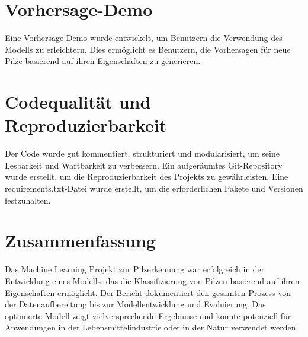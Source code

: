 \documentclass{article}
\begin{document}
\section{Vorhersage-Demo}
Eine Vorhersage-Demo wurde entwickelt, um Benutzern die Verwendung des Modells zu erleichtern. Dies ermöglicht es Benutzern, die Vorhersagen für neue Pilze basierend auf ihren Eigenschaften zu generieren.

\section{Codequalität und Reproduzierbarkeit}
Der Code wurde gut kommentiert, strukturiert und modularisiert, um seine Lesbarkeit und Wartbarkeit zu verbessern. Ein aufgeräumtes Git-Repository wurde erstellt, um die Reproduzierbarkeit des Projekts zu gewährleisten. Eine requirements.txt-Datei wurde erstellt, um die erforderlichen Pakete und Versionen festzuhalten.

\section{Zusammenfassung}
Das Machine Learning Projekt zur Pilzerkennung war erfolgreich in der Entwicklung eines Modells, das die Klassifizierung von Pilzen basierend auf ihren Eigenschaften ermöglicht. Der Bericht dokumentiert den gesamten Prozess von der Datenaufbereitung bis zur Modellentwicklung und Evaluierung. Das optimierte Modell zeigt vielversprechende Ergebnisse und könnte potenziell für Anwendungen in der Lebensmittelindustrie oder in der Natur verwendet werden.
\end{document}
